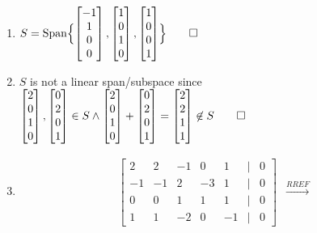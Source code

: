 \documentclass[12pt, a4paper]{article}
\begin{document}
\begin{enumerate}[Q\arabic*.]
\begin{enumerate}[(\alph*)]
      \item $S = \operatorname{Span}\Bigl\{\begin{bmatrix}-1\\1\\0\\0\end{bmatrix}, \begin{bmatrix}1\\0\\1\\0\end{bmatrix}, \begin{bmatrix}1\\0\\0\\1\end{bmatrix} \Bigr\} \qed$
      \item $S$ is not a linear span/subspace since $\begin{bmatrix}2\\0\\1\\0\end{bmatrix}, \begin{bmatrix}0\\2\\0\\1\end{bmatrix} \in S \land \begin{bmatrix}2\\0\\1\\0\end{bmatrix} + \begin{bmatrix}0\\2\\0\\1\end{bmatrix}=\begin{bmatrix}2\\2\\1\\1\end{bmatrix} \not\in S \qed$
      \item 
        \begin{align*}
          \begin{bmatrix}
            2&2&-1&0&1&|&0\\
            -1&-1&2&-3&1&|&0\\
            0&0&1&1&1&|&0\\
            1&1&-2&0&-1&|&0
          \end{bmatrix}&\xrightarrow{RREF}

\end{align*}
\end{enumerate}
\end{enumerate}
\end{document}
